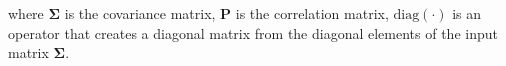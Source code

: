 \noindent where
$
\boldsymbol{\Sigma}
$
is the covariance matrix,
$
\mathbf{P}
$
is the correlation matrix,
$
\mathrm{diag}
\left(
\cdot
\right)
$
is an operator that creates a diagonal matrix
from the diagonal elements
of the input matrix
$
\boldsymbol{\Sigma}
$.
